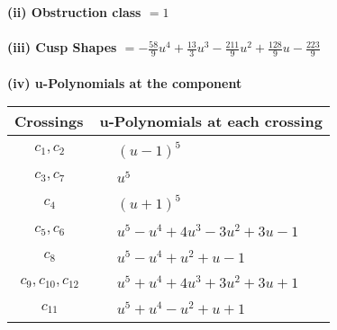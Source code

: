 \documentclass[1p]{elsarticle_modified}
\theoremstyle{definition}
\begin{document}
\flushleft \textbf{(ii) Obstruction class $= 1$}\\~\\
\flushleft \textbf{(iii) Cusp Shapes $= -\frac{58}{9} u^4+\frac{13}{3} u^3-\frac{211}{9} u^2+\frac{128}{9} u-\frac{223}{9}$}\\~\\
\newpage\renewcommand{\arraystretch}{1}
\flushleft \textbf{(iv) u-Polynomials at the component}\newline \\
\begin{tabular}{m{50pt}|m{274pt}}
Crossings & \hspace{64pt}u-Polynomials at each crossing \\
\hline $$\begin{aligned}c_{1},c_{2}\end{aligned}$$&$\begin{aligned}
&(u-1)^5
\end{aligned}$\\
\hline $$\begin{aligned}c_{3},c_{7}\end{aligned}$$&$\begin{aligned}
&u^5
\end{aligned}$\\
\hline $$\begin{aligned}c_{4}\end{aligned}$$&$\begin{aligned}
&(u+1)^5
\end{aligned}$\\
\hline $$\begin{aligned}c_{5},c_{6}\end{aligned}$$&$\begin{aligned}
&u^5- u^4+4 u^3-3 u^2+3 u-1
\end{aligned}$\\
\hline $$\begin{aligned}c_{8}\end{aligned}$$&$\begin{aligned}
&u^5- u^4+u^2+u-1
\end{aligned}$\\
\hline $$\begin{aligned}c_{9},c_{10},c_{12}\end{aligned}$$&$\begin{aligned}
&u^5+u^4+4 u^3+3 u^2+3 u+1
\end{aligned}$\\
\hline $$\begin{aligned}c_{11}\end{aligned}$$&$\begin{aligned}
&u^5+u^4- u^2+u+1
\end{aligned}$\\
\hline
\end{tabular}\\~\\
\end{document}
